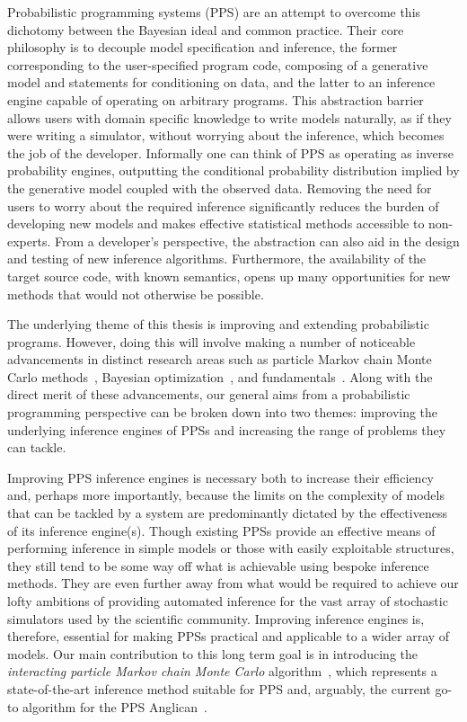 Probabilistic programming systems (PPS) \citep{goodman2008church} are an attempt to
overcome this dichotomy between the Bayesian ideal and common practice.  Their core philosophy 
is to decouple model specification and inference, the former corresponding to the user-specified 
program code, composing of a generative model and statements for conditioning on data, and the 
latter to an inference engine capable of operating on arbitrary programs.  This abstraction barrier 
allows users with domain specific knowledge to write models naturally, as if they were writing a 
simulator, without worrying about the inference, which becomes the job of the developer. Informally 
one can think of PPS as operating as inverse probability engines, outputting the conditional 
probability distribution implied by the generative model coupled with the observed data.
Removing the need for users to worry about the required inference significantly reduces the 
burden of developing new models and makes effective statistical methods accessible to 
non-experts.  From a developer's perspective, the abstraction can also aid in the design 
and testing of new inference algorithms.  Furthermore, the availability of the target source 
code, with known semantics, opens up many opportunities for new methods that would
not otherwise be possible.

The underlying theme of this thesis is improving and extending probabilistic programs.  However,
doing this will involve making a number of noticeable advancements in  distinct research areas such
as particle Markov chain Monte Carlo methods~\citep{andrieu2010particle},
Bayesian optimization~\citep{movckus1975bayesian}, and \mc
fundamentals~\citep{metropolis1949monte}.  Along with the direct merit of
these advancements, our general aims from a probabilistic programming perspective can be
broken down into two themes: improving the underlying inference engines of PPSs and increasing the
range of problems they can tackle.

Improving PPS inference engines is necessary both to increase their efficiency and,
perhaps more importantly, because the limits on the
complexity of models that can be tackled by a system are predominantly dictated by the 
effectiveness of its inference engine(s).  
 Though existing PPSs provide an effective means of performing
inference in simple models or those with easily exploitable structures, they still tend to be
some way off what is achievable using bespoke inference methods.  They are even further away from
what would be required to achieve our lofty ambitions of providing automated inference for
the vast array of stochastic simulators used by the scientific community.  
Improving inference engines is, therefore, essential for making PPSs practical and applicable 
to a wider array of models.
Our main contribution
to this long term goal is in introducing the \emph{interacting particle Markov chain Monte Carlo}
algorithm~\citep{rainforth2016interacting}, which represents a state-of-the-art inference method
suitable for PPS and, arguably, the current go-to algorithm for the PPS Anglican~\citep{wood2014new}.

